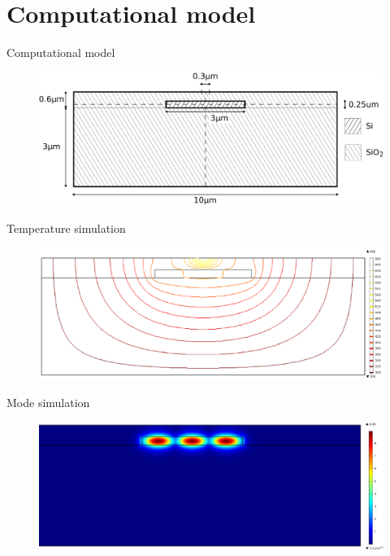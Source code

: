 \documentclass[11pt, leqno]{beamer}
\begin{document}
\section{Computational model}
\begin{frame}{Computational model}
	\begin{figure}
		\centering
		\includegraphics[width=\textwidth]{geometry.pdf}
	\end{figure}
\end{frame}
\begin{frame}{Temperature simulation}
	\begin{figure}
		\centering
		\includegraphics[width=\textwidth]{thermal.pdf}
	\end{figure}
\end{frame}
\begin{frame}{Mode simulation}
	\begin{figure}
		\centering
		\includegraphics[width=\textwidth]{output_modeTE.pdf}
	\end{figure}
\end{frame}
\end{document}
